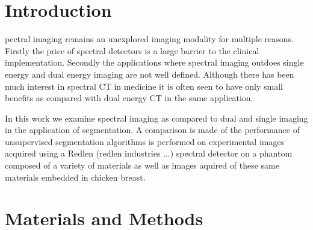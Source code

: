 \documentclass[journal, a4paper]{IEEEtran}
\begin{document}
\section{Introduction}


pectral imaging remains an unexplored imaging modality for multiple reasons. Firstly the price of spectral detectors is a large barrier to the clinical implementation. Secondly the applications where spectral imaging outdoes single energy and dual energy imaging are not well defined. Although there has been much interest in spectral CT in medicine it is often seen to have only small benefits as compared with dual energy CT in the same application. 

In this work we examine spectral imaging as compared to dual and single imaging in the application of segmentation. A comparison is made of the performance of unsupervised segmentation algorithms is performed on experimental images acquired using a Redlen (redlen industries ...) spectral detector on a phantom composed of a variety of materials as well as images aquired of these same materials embedded in chicken breast.

\section{Materials and Methods}
\end{document}
